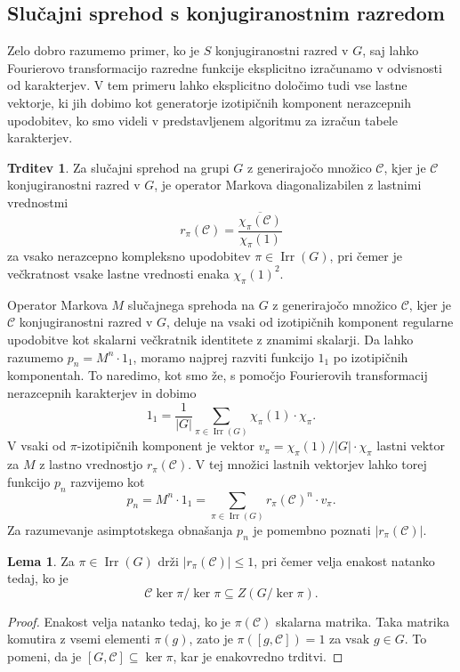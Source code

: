 \documentclass[11pt]{book}
\def\conclass{\mathcal{C}}
\DeclareMathOperator\Irr{Irr}
\theoremstyle{definition}
\theoremstyle{zgled}
\theoremstyle{odprtproblem}
\theoremstyle{domacanaloga}
\newenvironment{dokaz}
    {\color{siva}\begin{proof}}
    {\end{proof}}
\theoremstyle{izrek}
\newtheorem*{trditev}{Trditev}
\newtheorem*{lema}{Lema}
\begin{document}
\subsection{Slučajni sprehod s konjugiranostnim razredom}

Zelo dobro razumemo primer, ko je $S$ konjugiranostni razred v $G$, saj lahko Fourierovo transformacijo razredne funkcije eksplicitno izračunamo v odvisnosti od karakterjev. V tem primeru lahko eksplicitno določimo tudi vse lastne vektorje, ki jih dobimo kot generatorje izotipičnih komponent nerazcepnih upodobitev, ko smo videli v predstavljenem algoritmu za izračun tabele karakterjev.

\begin{trditev}
Za slučajni sprehod na grupi $G$ z generirajočo množico $\conclass$, kjer je $\conclass$ konjugiranostni razred v $G$, je operator Markova diagonalizabilen z lastnimi vrednostmi
\[
    r_{\pi}(\conclass) = \frac{\overline{\chi_{\pi}(\conclass)}}{\chi_{\pi}(1)}
\]
za vsako nerazcepno kompleksno upodobitev $\pi \in \Irr(G)$, pri čemer je večkratnost vsake lastne vrednosti enaka $\chi_{\pi}(1)^2$.
\end{trditev}

Operator Markova $M$ slučajnega sprehoda na $G$ z generirajočo množico $\conclass$, kjer je $\conclass$ konjugiranostni razred v $G$, deluje na vsaki od izotipičnih komponent regularne upodobitve kot skalarni večkratnik identitete z znamimi skalarji. Da lahko razumemo $p_n = M^n \cdot 1_1$, moramo najprej razviti funkcijo $1_1$ po izotipičnih komponentah. To naredimo, kot smo že, s pomočjo Fourierovih transformacij nerazcepnih karakterjev in dobimo
\[
    1_1 = \frac{1}{|G|} \sum_{\pi \in \Irr(G)} \chi_{\pi}(1) \cdot \chi_{\pi}.
\]
V vsaki od $\pi$-izotipičnih komponent je vektor $v_{\pi} = \chi_{\pi}(1)/|G| \cdot \chi_{\pi}$ lastni vektor za $M$ z lastno vrednostjo $r_{\pi}(\conclass)$. V tej množici lastnih vektorjev lahko torej funkcijo $p_n$ razvijemo kot
\[
    p_n = M^n \cdot 1_1 = \sum_{\pi \in \Irr(G)} r_{\pi}(\conclass)^n \cdot v_{\pi}.
\]
Za razumevanje asimptotskega obnašanja $p_n$ je pomembno poznati $|r_{\pi}(\conclass)|$.

\begin{lema}
Za $\pi \in \Irr(G)$ drži $|r_{\pi}(\conclass)| \leq 1$, pri čemer velja enakost natanko tedaj, ko je 
\[
    \conclass \ker \pi / \ker \pi \subseteq Z(G / \ker \pi).
\]
\end{lema}
\begin{dokaz}
Enakost velja natanko tedaj, ko je $\pi(\conclass)$ skalarna matrika. Taka matrika komutira z vsemi elementi $\pi(g)$, zato je $\pi([g, \conclass]) = 1$ za vsak $g \in G$. To pomeni, da je $[G, \conclass] \subseteq \ker \pi$, kar je enakovredno trditvi.
\end{dokaz}
\end{document}
